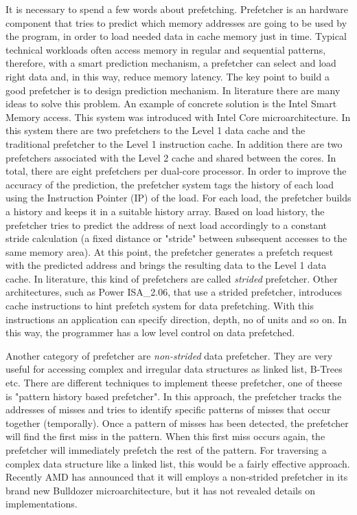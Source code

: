 It is necessary to spend a few words about prefetching. Prefetcher is an hardware component that tries to predict which memory addresses are
going to be used by the program, in order to load needed data in cache memory just in time.
Typical technical workloads often access memory in regular and sequential patterns, therefore, with a smart prediction mechanism, a prefetcher can select 
and load right data and, in this way, reduce memory latency. The key point to build a good prefetcher is to design prediction mechanism.
In literature there are many ideas to solve this problem. An example of concrete solution is the Intel Smart Memory access. This system was introduced
with Intel Core microarchitecture. In this system there are two prefetchers to the Level 1 data cache and the traditional prefetcher to the Level 1 
instruction cache. In addition there are two prefetchers associated with the Level 2 cache and shared between the cores. In total, there are eight
prefetchers per dual-core processor. 
In order to improve the accuracy of the prediction, the prefetcher system tags the history of each load using the Instruction Pointer (IP) of the load. 
For each load, the prefetcher builds a history and keeps it in a suitable history array. Based on load history, the prefetcher tries to predict the 
address of next load accordingly to a constant stride calculation (a fixed distance or "stride" between subsequent accesses to the same memory area). 
At this point, the prefetcher generates a prefetch request with the predicted address and brings the resulting data to the Level 1 data cache.
In literature, this kind of prefetchers are called \textit{strided} prefetcher.
Other architectures, such as Power ISA\_2.06, that use a strided prefetcher, introduces cache instructions to hint prefetch system for data prefetching.
With this instructions an application can specify direction, depth, no of units and so on. In this way, the programmer has a low level control on 
data prefetched.

Another category of prefetcher are \textit{non-strided} data prefetcher. They are very useful for accessing complex and irregular data structures as 
linked list, B-Trees etc. There are different techniques to implement theese prefetcher, one of theese is "pattern history based prefetcher". 
In this approach, the prefetcher tracks the addresses of misses and tries to identify specific patterns of misses that occur together (temporally). 
Once a pattern of misses has been detected, the prefetcher will find the first miss in the pattern. When this first miss occurs again, the prefetcher 
will immediately prefetch the rest of the pattern. For traversing a complex data structure like a linked list, this would be a fairly effective approach.
Recently AMD has announced that it will employs a non-strided prefetcher in its brand new Bulldozer microarchitecture, but it has not revealed details on 
implementations.

